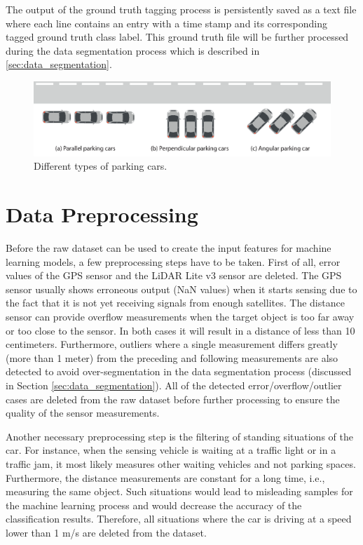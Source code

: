 The output of the ground truth tagging process is persistently saved as a text file where each line contains an entry with a time stamp and its corresponding tagged ground truth class label. This ground truth file will be further processed during the data segmentation process which is described in \ref{sec:data_segmentation}. 


\begin{figure}
	\centering
	\includegraphics[width=\textwidth]{img/types-of-parking-cars.eps}
	\caption{Different types of parking cars.}
	\label{fig:types_of_parking_cars}
\end{figure}


\section{Data Preprocessing}
\label{sec:data_preprocessing}

Before the raw dataset can be used to create the input features for machine learning models, a few preprocessing steps have to be taken. First of all, error values of the GPS sensor and the LiDAR Lite v3 sensor are deleted. The GPS sensor usually shows erroneous output (NaN values) when it starts sensing due to the fact that it is not yet receiving signals from enough satellites. The distance sensor can provide overflow measurements when the target object is too far away or too close to the sensor. In both cases it will result in a distance of less than 10 centimeters. Furthermore, outliers where a single measurement differs greatly (more than 1 meter) from the preceding and following measurements are also detected to avoid over-segmentation in the data segmentation process (discussed in Section \ref{sec:data_segmentation}). All of the detected error/overflow/outlier cases are deleted from the raw dataset before further processing to ensure the quality of the sensor measurements.

Another necessary preprocessing step is the filtering of standing situations of the car. For instance, when the sensing vehicle is waiting at a traffic light or in a traffic jam, it most likely measures other waiting vehicles and not parking spaces. Furthermore, the distance measurements are constant for a long time, i.e., measuring the same object. Such situations would lead to misleading samples for the machine learning process and would decrease the accuracy of the classification results. Therefore, all situations where the car is driving at a speed lower than 1 m/s are deleted from the dataset.

